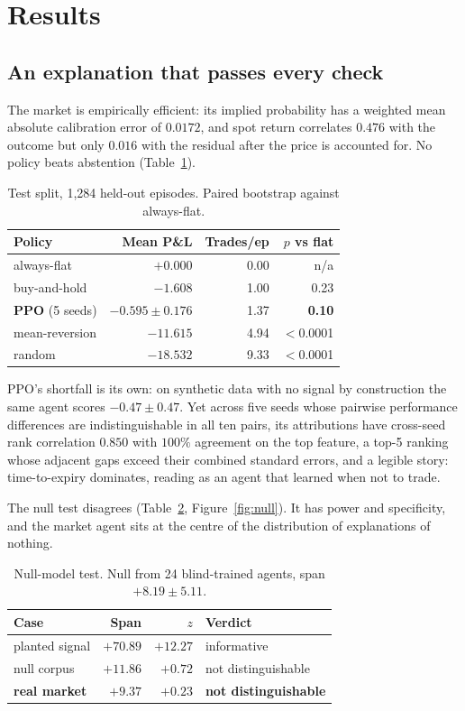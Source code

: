 \documentclass[10pt,twocolumn]{article}
\begin{document}
\section{Results}

\subsection{An explanation that passes every check}

The market is empirically efficient: its implied probability has a weighted mean
absolute calibration error of $0.0172$, and spot return correlates $0.476$ with
the outcome but only $0.016$ with the residual after the price is accounted for.
No policy beats abstention (Table~\ref{tab:base}).

\begin{table}[t]
\centering\small
\caption{Test split, 1{,}284 held-out episodes. Paired bootstrap against
always-flat.}
\label{tab:base}
\begin{tabular}{lrrr}
\toprule
Policy & Mean P\&L & Trades/ep & $p$ vs flat \\
\midrule
always-flat & $+0.000$ & 0.00 & n/a \\
buy-and-hold & $-1.608$ & 1.00 & 0.23 \\
\textbf{PPO} (5 seeds) & $\mathbf{-0.595 \pm 0.176}$ & 1.37 & \textbf{0.10} \\
mean-reversion & $-11.615$ & 4.94 & $<$0.0001 \\
random & $-18.532$ & 9.33 & $<$0.0001 \\
\bottomrule
\end{tabular}
\end{table}

PPO's shortfall is its own: on synthetic data with no signal by construction the
same agent scores $-0.47 \pm 0.47$. Yet across five seeds whose pairwise
performance differences are indistinguishable in all ten pairs, its attributions
have cross-seed rank correlation $0.850$ with $100\%$ agreement on the top
feature, a top-5 ranking whose adjacent gaps exceed their combined standard
errors, and a legible story: time-to-expiry dominates, reading as an agent that
learned when not to trade.

The null test disagrees (Table~\ref{tab:null}, Figure~\ref{fig:null}). It has
power and specificity, and the market agent sits at the centre of the
distribution of explanations of nothing.

\begin{table}[t]
\centering\small
\caption{Null-model test. Null from 24 blind-trained agents, span
$+8.19 \pm 5.11$.}
\label{tab:null}
\begin{tabular}{lrrl}
\toprule
Case & Span & $z$ & Verdict \\
\midrule
planted signal & $+70.89$ & $\mathbf{+12.27}$ & informative \\
null corpus & $+11.86$ & $+0.72$ & not distinguishable \\
\textbf{real market} & $\mathbf{+9.37}$ & $\mathbf{+0.23}$ & \textbf{not distinguishable} \\
\bottomrule
\end{tabular}
\end{table}
\end{document}
